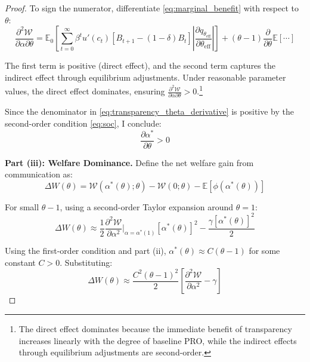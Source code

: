 \documentclass[12pt]{article}
\theoremstyle{plain}
\begin{document}
\begin{proof}
	To sign the numerator, differentiate \eqref{eq:marginal_benefit} with respect
	to $\theta$:
	\begin{equation}
		\frac{\partial^2 \mathcal{W}}{\partial \alpha \partial \theta} = \mathbb{E}_0 \left[ \sum_{t=0}^\infty \beta^t u'(c_t) [B_{t+1} - (1-\delta)B_t] \left|\frac{\partial q_{\theta_{\text{eff}}}}{\partial \theta_{\text{eff}}}\right| \right] + (\theta-1) \frac{\partial}{\partial \theta} \mathbb{E}[\cdots] \label{eq:cross_derivative}
	\end{equation}

	The first term is positive (direct effect), and the second term captures the
	indirect effect through equilibrium adjustments. Under reasonable parameter
	values, the direct effect dominates, ensuring $\frac{\partial^2
			\mathcal{W}}{\partial \alpha \partial \theta} > 0$.\footnote{The direct effect
		dominates because the immediate benefit of transparency increases linearly with
		the degree of baseline PRO, while the indirect effects through equilibrium
		adjustments are second-order.}

	Since the denominator in \eqref{eq:transparency_theta_derivative} is positive
by the second-order condition \eqref{eq:soc}, I conclude:
	\begin{equation}
		\frac{\partial
			\alpha^*}{\partial \theta} > 0 \label{eq:transparency_increasing}
	\end{equation}

	\textbf{Part (iii): Welfare Dominance.}
	Define the net welfare gain from communication as:
	\begin{equation}
		\Delta W(\theta) = \mathcal{W}(\alpha^*(\theta); \theta) - \mathcal{W}(0; \theta) - \mathbb{E}[\phi(\alpha^*(\theta))] \label{eq:welfare_gain}
	\end{equation}

	For small $\theta-1$, using a second-order Taylor expansion around $\theta =
		1$:
	\begin{equation}
		\Delta W(\theta) \approx \frac{1}{2} \frac{\partial^2 \mathcal{W}}{\partial \alpha^2}\bigg|_{\alpha=\alpha^*(1)} [\alpha^*(\theta)]^2 - \frac{\gamma [\alpha^*(\theta)]^2}{2} \label{eq:welfare_expansion}
	\end{equation}

	Using the first-order condition and part (ii), $\alpha^*(\theta) \approx
		C(\theta-1)$ for some constant $C > 0$. Substituting:
	\begin{equation}
		\Delta W(\theta) \approx \frac{C^2(\theta-1)^2}{2} \left[ \frac{\partial^2 \mathcal{W}}{\partial \alpha^2} - \gamma \right] \label{eq:welfare_approximation}
	\end{equation}


\end{proof}
\end{document}
